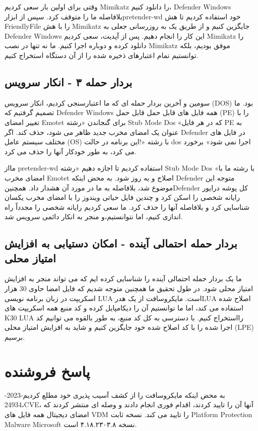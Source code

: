 \documentclass{ISCISC2020}
\begin{document}
وقتی برای اولین بار سعی کردیم Mimikatz را دانلود کنیم، Defender Windows بلافاصله ما را متوقف کرد. سپس از 
ابزارpretender-wd خود استفاده کردیم تا هش FriendlyFile را با هش Mimikatz جایگزین کنیم و از طریق یک 
به روزرسانی جعلی به Defender Windows این کار را انجام دهیم. پس از آپدیت، سعی کردیم Mimikatz را دانلود 
کرده و دوباره اجرا کنیم. ما نه تنها در نصب Mimikatz موفق بودیم، بلکه توانستیم تمام اعتبارهای ذخیره شده را از آن 
دستگاه استخراج کنیم.

\subsection{بردار حمله ۳ - انکار سرویس}
سومین و آخرین بردار حمله ای که ما اعتبارسنجی کردیم، انکار سرویس (DOS) بود. ما تصمیم گرفتیم که Defender
Windows همه فایل های قابل حمل قابل حمل (PE) را با تغییر امضای Emotet برای گنجاندن «رشته Stub Mode
Dos «که در هر فایل PE به عنوان یک امضای مخرب جدید ظاهر می شود، حذف کند. اگر Defender در فایل های 
مختلف سیستم عامل (OS) با رشته «!این برنامه در حالت dos اجرا نمی شود» برخورد می کرد، به طور خودکار آنها را 
حذف می کرد.


مااز pretender-wd استفاده کردیم تا اجازه دهیم «رشته Stub Mode Dos «با رشته ما با امضای مخرب Emotet
اصلاح و به روز شود. به محض اینکه Defender متوجه این موضوع شد، بلافاصله به ما در مورد آن هشدار داد. 
همچنینDefender کل پوشه درایور رایانه شخصی را اسکن کرد و چندین فایل حیاتی ویندوز را با امضای مخرب 
یکسان شناسایی کرد و بلافاصله آنها را حذف کرد. ما سعی کردیم رایانه شخصی را مجدداً راه اندازی کنیم، اما 
نتوانستیم،و منجر به انکار دائمی سرویس شد.

\subsection{بردار حمله احتمالی آینده - امکان دستیابی به افزایش امتیاز محلی}
ما یک بردار حمله احتمالی آینده را شناسایی کرده ایم که می تواند منجر به افزایش امتیاز محلی شود. در طول تحقیق ما 
همچنین متوجه شدیم که فایل امضا حاوی 30 هزار اسکریپت در زبان برنامه نویسی LUA است. مایکروسافت از یک 
هدرLUA اصلاح شده استفاده می کند، اما ما توانستیم آن را دیکامپایل کرده و کد منبع همه اسکریپت های K30 LUA
رااستخراج کنیم. با دسترسی به کل کد منبع، به طور بالقوه می توانیم کد اجرا شده را با کد اصلاح شده خود جایگزین 
کنیم و شاید به افزایش امتیاز محلی (LPE) برسیم.

\section{پاسخ فروشنده}
به محض اینکه مایکروسافت را از کشف آسیب پذیری خود مطلع کردیم-2023-24934،CVE، آنها آن را تایید کردند، 
اقدام فوری انجام دادند و وصله ای منتشر کردند که امضای دیجیتال همه فایل های VDM را تایید می کند. نسخه ثابت  Platform Protection Malware Microsoft نسخه ۴.۱۸.۲۳۰۳.۸ است.
\end{document}
